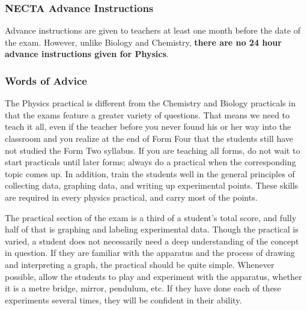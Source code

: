 \subsubsection{NECTA Advance Instructions}
Advance instructions are given to teachers at least one month before the date of the exam. However, unlike Biology and Chemistry, \textbf{there are no 24 hour advance instructions given for Physics}.


\subsubsection{Words of Advice}

The Physics practical is different from the Chemistry and Biology practicals in that
the exams feature a greater variety of questions. That means we need to teach it all, even if the teacher before you never found his or her way into the classroom and you realize at the end of Form Four that the students still have not studied the Form Two syllabus. If you are teaching all forms, do not wait to start practicals until later forms; always do a practical when the corresponding topic comes up. In addition, train the students well in the general principles of collecting data, graphing data, and writing up experimental points. These skills are required in every physics practical, and carry most of the points.

The practical section of the exam is a third of a student’s total score, and fully half
of that is graphing and labeling experimental data. 
Though the practical is varied, a student does not necessarily need a deep
understanding of the concept in question. If they are familiar with the apparatus and the
process of drawing and interpreting a graph, the practical should be quite simple.
Whenever possible, allow the students to play and experiment with the apparatus,
whether it is a metre bridge, mirror, pendulum, etc. If they have done each of these experiments several times, they will be confident in their ability.

